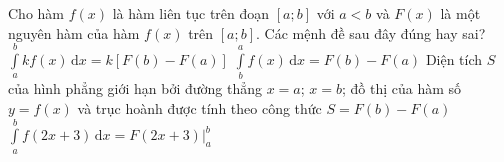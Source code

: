 %
\begin{ex}%
	Cho hàm $ f(x)$ là hàm liên tục trên đoạn $\left[a;b\right]$ với $ a<b$ và $F(x)$ là một nguyên hàm của hàm $ f(x)$ trên $\left[a;b\right]$. Các mệnh đề sau đây đúng hay sai?
	\choiceTF
	{\True $\displaystyle\int\limits_a^b{kf(x)\mathrm{\,d}x}=k\left[F(b)-F(a)\right]$}
	{$\displaystyle\int\limits_b^af(x)\mathrm{\,d}x=F(b)-F(a)$}
	{Diện tích $S$ của hình phẳng giới hạn bởi đường thẳng $x=a$; $x=b$; đồ thị của hàm số $ y=f(x)$ và trục hoành được tính theo công thức $ S=F(b)-F(a)$}
	{$\displaystyle\int\limits_a^b{f\left(2x+3\right)\mathrm{\,d}x}=F\left(2x+3\right)\big|_a^b$}
\end{ex}
%
